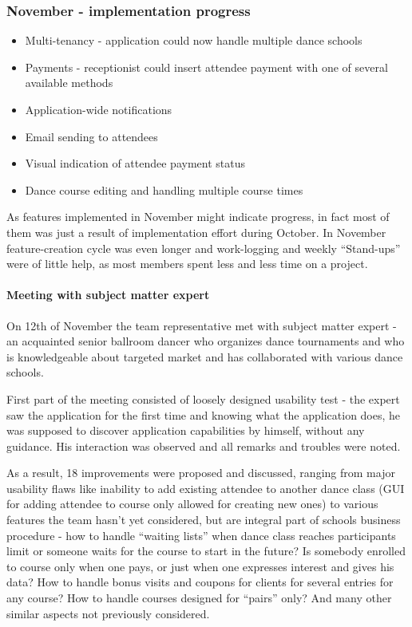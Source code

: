 \documentclass{article}
\begin{document}
\subsubsection{November - implementation progress}
\begin{itemize}
\item Multi-tenancy - application could now handle multiple dance schools 
\item Payments - receptionist could insert attendee payment with one of several available methods
\item Application-wide notifications
\item Email sending to attendees
\item Visual indication of attendee payment status
\item Dance course editing and handling multiple course times
\end{itemize}
As features implemented in November might indicate progress, in fact most of them was just a result of implementation effort during October. In November feature-creation cycle was even longer and work-logging and weekly ``Stand-ups'' were of little help, as most members spent less and less time on a project.

\paragraph{Meeting with subject matter expert}
On 12th of November the team representative met with subject matter expert - an acquainted senior ballroom dancer who organizes dance tournaments and who is knowledgeable about targeted market and has collaborated with various dance schools. 

First part of the meeting consisted of loosely designed usability test - the expert saw the application for the first time and knowing what the application does, he was supposed to discover application capabilities by himself, without any guidance. His interaction was observed and all remarks and troubles were noted.

As a result, 18 improvements were proposed and discussed, ranging from major usability flaws like inability to add existing attendee to another dance class (GUI for adding attendee to course only allowed for creating new ones) to various features the team hasn't yet considered, but are integral part of schools business procedure - how to handle ``waiting lists'' when dance class reaches participants limit or someone waits for the course to start in the future? Is somebody enrolled to course only when one pays, or just when one expresses interest and gives his data? How to handle bonus visits and coupons for clients for several entries for any course? How to handle courses designed for ``pairs'' only? And many other similar aspects not previously considered.
\end{document}
